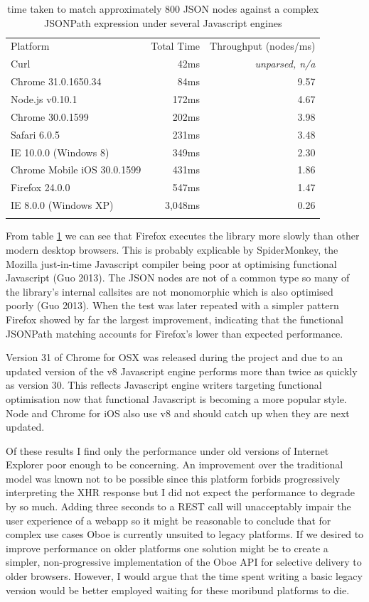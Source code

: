 \documentclass[12pt, ]{article}
\begin{document}
\begin{longtable}[c]{@{}lrr@{}}
\hline\noalign{\medskip}
Platform & Total Time & Throughput (nodes/ms)
\\\noalign{\medskip}
\hline\noalign{\medskip}
Curl & 42ms & \emph{unparsed, n/a}
\\\noalign{\medskip}
Chrome 31.0.1650.34 & 84ms & 9.57
\\\noalign{\medskip}
Node.js v0.10.1 & 172ms & 4.67
\\\noalign{\medskip}
Chrome 30.0.1599 & 202ms & 3.98
\\\noalign{\medskip}
Safari 6.0.5 & 231ms & 3.48
\\\noalign{\medskip}
IE 10.0.0 (Windows 8) & 349ms & 2.30
\\\noalign{\medskip}
Chrome Mobile iOS 30.0.1599 & 431ms & 1.86
\\\noalign{\medskip}
Firefox 24.0.0 & 547ms & 1.47
\\\noalign{\medskip}
IE 8.0.0 (Windows XP) & 3,048ms & 0.26
\\\noalign{\medskip}
\hline
\noalign{\medskip}
\caption{time taken to match approximately 800 JSON nodes against a
complex JSONPath expression under several Javascript engines
\label{browsers}}
\end{longtable}

From table \ref{browsers} we can see that Firefox executes the library
more slowly than other modern desktop browsers. This is probably
explicable by SpiderMonkey, the Mozilla just-in-time Javascript compiler
being poor at optimising functional Javascript (Guo 2013). The JSON
nodes are not of a common type so many of the library's internal
callsites are not monomorphic which is also optimised poorly (Guo 2013).
When the test was later repeated with a simpler pattern Firefox showed
by far the largest improvement, indicating that the functional JSONPath
matching accounts for Firefox's lower than expected performance.

Version 31 of Chrome for OSX was released during the project and due to
an updated version of the v8 Javascript engine performs more than twice
as quickly as version 30. This reflects Javascript engine writers
targeting functional optimisation now that functional Javascript is
becoming a more popular style. Node and Chrome for iOS also use v8 and
should catch up when they are next updated.

Of these results I find only the performance under old versions of
Internet Explorer poor enough to be concerning. An improvement over the
traditional model was known not to be possible since this platform
forbids progressively interpreting the XHR response but I did not expect
the performance to degrade by so much. Adding three seconds to a REST
call will unacceptably impair the user experience of a webapp so it
might be reasonable to conclude that for complex use cases Oboe is
currently unsuited to legacy platforms. If we desired to improve
performance on older platforms one solution might be to create a
simpler, non-progressive implementation of the Oboe API for selective
delivery to older browsers. However, I would argue that the time spent
writing a basic legacy version would be better employed waiting for
these moribund platforms to die.
\end{document}
